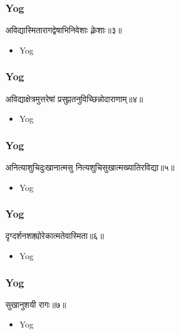 \begin{frame}[fragile]\frametitle{Yog}
\begin{sanskrit}
अविद्यास्मितारागद्वेषाभिनिवेशाः क्लेशाः॥३॥
\end{sanskrit}
	\begin{itemize}
	\item Yog 
	\end{itemize}
\end{frame}

\begin{frame}[fragile]\frametitle{Yog}
\begin{sanskrit}
अविद्याक्षेत्रमुत्तरेषां प्रसुप्ततनुविच्छिन्नोदाराणाम्॥४॥
\end{sanskrit}
	\begin{itemize}
	\item Yog 
	\end{itemize}
\end{frame}


\begin{frame}[fragile]\frametitle{Yog}
\begin{sanskrit}
अनित्याशुचिदुःखानात्मसु नित्यशुचिसुखात्मख्यातिरविद्या॥५॥
\end{sanskrit}
	\begin{itemize}
	\item Yog 
	\end{itemize}
\end{frame}


\begin{frame}[fragile]\frametitle{Yog}
\begin{sanskrit}
दृग्दर्शनशक्त्योरेकात्मतेवास्मिता॥६॥
\end{sanskrit}
	\begin{itemize}
	\item Yog 
	\end{itemize}
\end{frame}



\begin{frame}[fragile]\frametitle{Yog}
\begin{sanskrit}
सुखानुशयी रागः॥७॥
\end{sanskrit}
	\begin{itemize}
	\item Yog 
	\end{itemize}
\end{frame}



